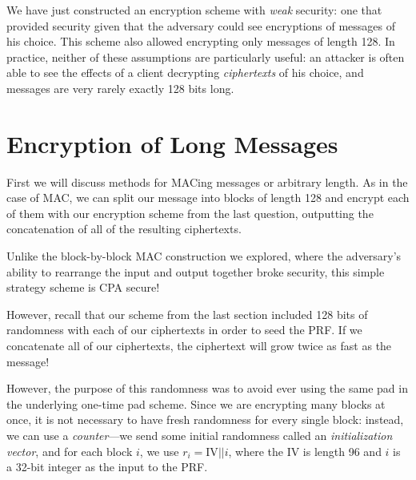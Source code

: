 We have just constructed an encryption scheme with \emph{weak} security: one that provided security given that the adversary could see encryptions of messages of his choice. This scheme also allowed encrypting only messages of length 128. In practice, neither of these assumptions are particularly useful: an attacker is often able to see the effects of a client decrypting \emph{ciphertexts} of his choice, and messages are very rarely exactly 128 bits long.

\section{Encryption of Long Messages}
First we will discuss methods for MACing messages or arbitrary length. As in the case of MAC, we can split our message into blocks of length 128 and encrypt each of them with our encryption scheme from the last question, outputting the concatenation of all of the resulting ciphertexts.

Unlike the block-by-block MAC construction we explored, where the adversary's ability to rearrange the input and output together broke security, this simple strategy scheme is CPA secure! 

However, recall that our scheme from the last section included 128 bits of randomness with each of our ciphertexts in order to seed the PRF. If we concatenate all of our ciphertexts, the ciphertext will grow twice as fast as the message! 

However, the purpose of this randomness was to avoid ever using the same pad in the underlying one-time pad scheme. Since we are encrypting many blocks at once, it is not necessary to have fresh randomness for every single block: instead, we can use a \emph{counter}---we send some initial randomness called an \emph{initialization vector}, and for each block $i$, we use $r_i = \text{IV} || i$, where the IV is length 96 and $i$ is a 32-bit integer as the input to the PRF.


